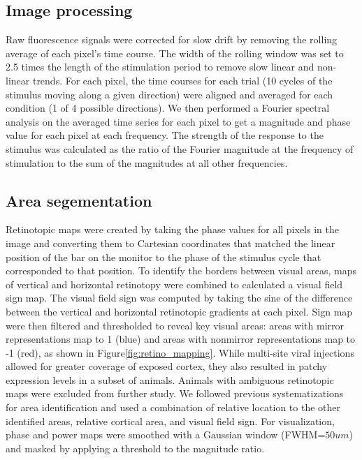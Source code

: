 \subsection{Image processing}
Raw fluorescence signals were corrected for slow drift by removing the rolling average of each pixel’s time course. The width of the rolling window was set to 2.5 times the length of the stimulation period to remove slow linear and non-linear trends. For each pixel, the time courses for each trial (10 cycles of the stimulus moving along a given direction) were aligned and averaged for each condition (1 of 4 possible directions). We then performed a Fourier spectral analysis on the averaged time series for each pixel to get a magnitude and phase value for each pixel at each frequency. The strength of the response to the stimulus was calculated as the ratio of the Fourier magnitude at the frequency of stimulation to the sum of the magnitudes at all other frequencies\cite{Kalatsky2003, Marshel2011, Juavinett2017}.

\subsection{Area segementation}
Retinotopic maps were created by taking the phase values for all pixels in the image and converting them to Cartesian coordinates that matched the linear position of the bar on the monitor to the phase of the stimulus cycle that corresponded to that position. To identify the borders between visual areas, maps of vertical and horizontal retinotopy were combined to calculated a visual field sign map\cite{Juavinett2017, Zhuang2017}. The visual field sign was computed by taking the sine of the difference between the vertical and horizontal retinotopic gradients at each pixel. Sign map were then filtered and thresholded to reveal key visual areas:  areas with mirror representations map to 1 (blue) and areas with nonmirror representations map to -1 (red), as shown in Figure\ref{fig:retino_mapping}. 
While multi-site viral injections allowed for greater coverage of exposed cortex, they also resulted in patchy expression levels in a subset of animals. Animals with ambiguous retinotopic maps were excluded from further study. We followed previous systematizations for area identification\cite{Juavinett2017} and used a combination of relative location to the other identified areas, relative cortical area, and visual field sign. For visualization, phase and power maps were smoothed with a Gaussian window (FWHM=$50um$) and masked by applying a threshold to the magnitude ratio.  

